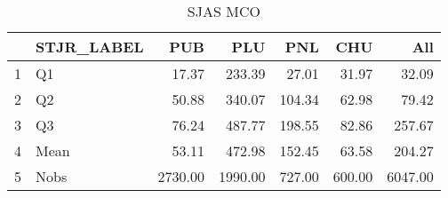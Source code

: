 \begin{table}[ht]
\centering
\begin{tabular}{rlrrrrr}
  \hline
 & STJR\_LABEL & PUB & PLU & PNL & CHU & All \\ 
  \hline
1 & Q1 & 17.37 & 233.39 & 27.01 & 31.97 & 32.09 \\ 
  2 & Q2 & 50.88 & 340.07 & 104.34 & 62.98 & 79.42 \\ 
  3 & Q3 & 76.24 & 487.77 & 198.55 & 82.86 & 257.67 \\ 
  4 & Mean & 53.11 & 472.98 & 152.45 & 63.58 & 204.27 \\ 
  5 & Nobs & 2730.00 & 1990.00 & 727.00 & 600.00 & 6047.00 \\ 
   \hline
\end{tabular}
\caption{SJAS MCO} 
\end{table}
